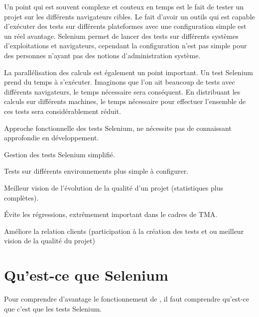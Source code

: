 Un point qui est souvent complexe et couteux en temps est le fait de tester un projet 
sur les différents navigateurs cibles.  Le fait d'avoir un outils qui est capable d'exécuter
des tests sur différents plateformes avec une configuration simple est un réel avantage.
Selenium permet de lancer des tests sur différents systèmes d'exploitations et navigateurs, 
cependant la configuration n'est pas simple pour des personnes n'ayant pas des notions 
d'administration système. 

La parallélisation des calculs est également un point important.  Un test Selenium prend du 
temps à s'exécuter. Imaginons que l'on ait  beaucoup de tests avec différents navigateurs, le
temps nécessaire sera conséquent. En distribuant les calculs sur différents machines, le temps
nécessaire pour effectuer l'ensemble de ces tests sera considérablement réduit. 

\begin{description}
	\item \positif{}
	  Approche fonctionnelle des tests Selenium, ne nécessite pas de connaissant approfondie en développement.
	\item \positif{}  Gestion des tests Selenium simplifié.
	\item \positif{}  Tests sur différents environnements plus simple à configurer.
	\item \positif{}  Meilleur vision de l'évolution de la qualité d'un projet (statistiques plus complètes).
	\item \positif{}  Évite les régressions, extrêmement important dans le cadres de TMA.
	\item \positif{}  Améliore la relation clients (participation à la création des tests et ou meilleur vision de la qualité du projet)
\end{description}


\section{Qu'est-ce que Selenium}
Pour comprendre d'avantage le fonctionnement de \youTestIt{}, il faut comprendre qu'est-ce que
c'est que les tests Selenium.

